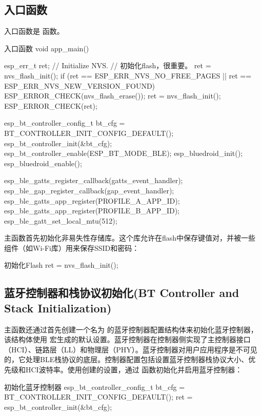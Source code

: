 \documentclass[lang=cn,newtx,10pt,scheme=chinese]{elegantbook}
\begin{document}
\subsection{入口函数}

入口函数是  函数。

\begin{mycode}{入口函数}
void app_main()
{
    esp_err_t ret;
    // Initialize NVS.
    // 初始化flash，很重要。
    ret = nvs_flash_init();
    if (ret == ESP_ERR_NVS_NO_FREE_PAGES
        || ret == ESP_ERR_NVS_NEW_VERSION_FOUND) {
        ESP_ERROR_CHECK(nvs_flash_erase());
        ret = nvs_flash_init();
    }
    ESP_ERROR_CHECK(ret);

    esp_bt_controller_config_t bt_cfg = BT_CONTROLLER_INIT_CONFIG_DEFAULT();
    esp_bt_controller_init(&bt_cfg);
    esp_bt_controller_enable(ESP_BT_MODE_BLE);
    esp_bluedroid_init();
    esp_bluedroid_enable();

    esp_ble_gatts_register_callback(gatts_event_handler);
    esp_ble_gap_register_callback(gap_event_handler);
    esp_ble_gatts_app_register(PROFILE_A_APP_ID);
    esp_ble_gatts_app_register(PROFILE_B_APP_ID);
    esp_ble_gatt_set_local_mtu(512);
}
\end{mycode}

主函数首先初始化非易失性存储库。这个库允许在flash中保存键值对，并被一些组件（如Wi-Fi库）用来保存SSID和密码：

\begin{mycode}{初始化Flash}
ret = nvs_flash_init();
\end{mycode}

\subsection{蓝牙控制器和栈协议初始化(BT Controller and Stack Initialization)}

主函数还通过首先创建一个名为  的蓝牙控制器配置结构体来初始化蓝牙控制器，该结构体使用  宏生成的默认设置。蓝牙控制器在控制器侧实现了主控制器接口（HCI）、链路层（LL）和物理层（PHY）。蓝牙控制器对用户应用程序是不可见的，它处理BLE栈协议的底层。控制器配置包括设置蓝牙控制器栈协议大小、优先级和HCI波特率。使用创建的设置，通过  函数初始化并启用蓝牙控制器：

\begin{mycode}{初始化蓝牙控制器}
esp_bt_controller_config_t bt_cfg = BT_CONTROLLER_INIT_CONFIG_DEFAULT();
ret = esp_bt_controller_init(&bt_cfg);
\end{mycode}
\end{document}
